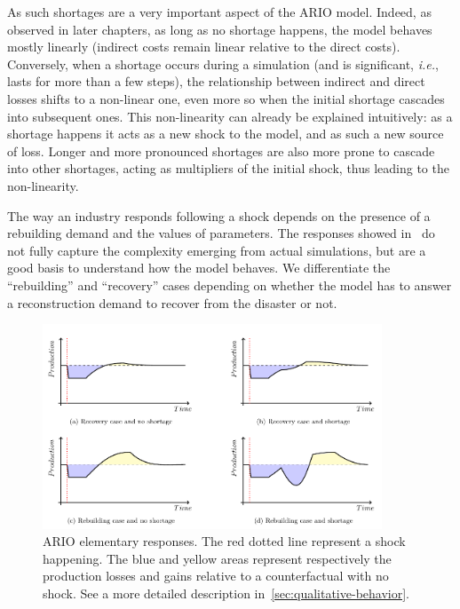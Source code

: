 As such shortages are a very important aspect of the ARIO model. Indeed, as
observed in later chapters, as long as no shortage happens, the model behaves
mostly linearly (indirect costs remain linear relative to the direct costs). Conversely,
when a shortage occurs during a simulation (and is significant, \emph{i.e.},
lasts for more than a few steps), the relationship between indirect and direct
losses shifts to a non-linear one, even more so when the initial shortage
cascades into subsequent ones. This non-linearity can already be explained intuitively:
as a shortage happens it acts as a new shock to the model, and as such a new
source of loss. Longer and more pronounced shortages are also more prone to cascade
into other shortages, acting as multipliers of the initial shock, thus leading
to the non-linearity.

The way an industry responds following a shock depends on the presence of a
rebuilding demand and the values of parameters. The responses showed
in~ do not fully capture the complexity emerging from
actual simulations, but are a good basis to understand how the model behaves. We
differentiate the ``rebuilding'' and ``recovery'' cases depending on whether the
model has to answer a reconstruction demand to recover from the disaster or not.

\begin{figure}[ht]
\includegraphics[width=0.9\textwidth]{imgs/ARIO-basic-responses}
\caption[ARIO elementary responses]{ARIO elementary responses. The red dotted
  line represent a shock happening. The blue and yellow areas represent respectively the production
  losses and gains relative to a counterfactual with no shock. See a more detailed
  description in~\cref{sec:qualitative-behavior}.\label{fig:ario-responses}}
\end{figure}

